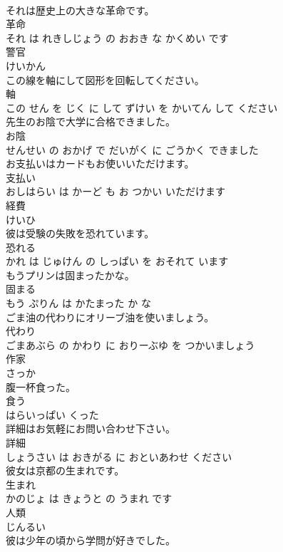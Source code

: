 \documentclass[8pt]{extreport}
\begin{document}
\begin{CJK}{UTF8}{min}
\\	それは歴史上の大きな革命です。	
\\	革命 
\\	それ は れきしじょう の おおき な かくめい です			
\\	警官	
\\	けいかん			
\\	この線を軸にして図形を回転してください。	
\\	軸 
\\	この せん を じく に して ずけい を かいてん して ください			
\\	先生のお陰で大学に合格できました。	
\\	お陰 
\\	せんせい の おかげ で だいがく に ごうかく できました			
\\	お支払いはカードもお使いいただけます。	
\\	支払い 
\\	おしはらい は かーど も お つかい いただけます			
\\	経費	
\\	けいひ			
\\	彼は受験の失敗を恐れています。	
\\	恐れる 
\\	かれ は じゅけん の しっぱい を おそれて います			
\\	もうプリンは固まったかな。	
\\	固まる 
\\	もう ぷりん は かたまった か な			
\\	ごま油の代わりにオリーブ油を使いましょう。	
\\	代わり 
\\	ごまあぶら の かわり に おりーぶゆ を つかいましょう			
\\	作家	
\\	さっか			
\\	腹一杯食った。	
\\	食う 
\\	はらいっぱい くった			
\\	詳細はお気軽にお問い合わせ下さい。	
\\	詳細 
\\	しょうさい は おきがる に おといあわせ ください			
\\	彼女は京都の生まれです。	
\\	生まれ 
\\	かのじょ は きょうと の うまれ です			
\\	人類	
\\	じんるい			
\\	彼は少年の頃から学問が好きでした。	

\end{CJK}
\end{document}
